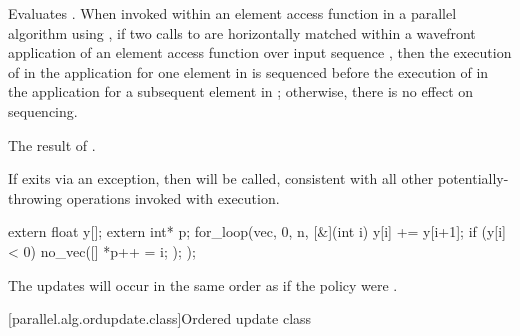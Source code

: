 \begin{itemdescr}
\pnum
\effects Evaluates . When invoked within an element access function in a parallel algorithm using , if two calls to  are horizontally matched within a wavefront application of an element access function over input sequence , then the execution of  in the application for one element in  is sequenced before the execution of  in the application for a subsequent element in ; otherwise, there is no effect on sequencing.

\pnum
\returns The result of .

\pnum
\realnotes If  exits via an exception, then  will be called, consistent with all other potentially-throwing operations invoked with  execution.

\begin{example}
\begin{codeblock}
extern float y[];
extern int* p;
for_loop(vec, 0, n, [&](int i) {
  y[i] += y[i+1];
  if (y[i] < 0) {
    no_vec([]{
      *p++ = i;
    });
  }
});
\end{codeblock}

The updates  will occur in the same order as if the policy were .
\end{example}

\end{itemdescr}

[parallel.alg.ordupdate.class]{Ordered update class}

